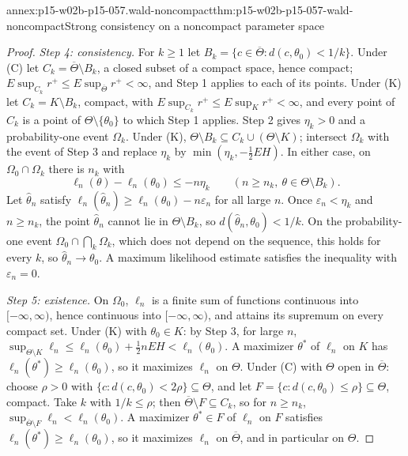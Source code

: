 \begin{annexitem}{annex:p15-w02b-p15-057.wald-noncompact}{thm:p15-w02b-p15-057-wald-noncompact}{Strong consistency on a noncompact parameter space}
\begin{proof}
\emph{Step 4: consistency.} For \(k\geq1\) let
\(B_k=\{c\in\overline\Theta:d(c,\theta_0)<1/k\}\). Under (C) let
\(C_k=\overline\Theta\setminus B_k\), a closed subset of a compact space,
hence compact; \(E\sup_{C_k}r^+\leq E\sup_{\overline\Theta}r^+<\infty\),
and Step 1 applies to each of its points. Under (K) let
\(C_k=K\setminus B_k\), compact, with
\(E\sup_{C_k}r^+\leq E\sup_Kr^+<\infty\), and every point of \(C_k\) is a
point of \(\Theta\setminus\{\theta_0\}\) to which Step 1 applies. Step 2
gives \(\eta_k>0\) and a probability-one event \(\Omega_k\). Under (K),
\(\Theta\setminus B_k\subseteq C_k\cup(\Theta\setminus K)\); intersect
\(\Omega_k\) with the event of Step 3 and replace \(\eta_k\) by
\(\min(\eta_k,-\tfrac12EH)\). In either case, on \(\Omega_0\cap\Omega_k\)
there is \(n_k\) with
\[
 \ell_n(\theta)-\ell_n(\theta_0)\leq-n\eta_k\qquad
 (n\geq n_k,\ \theta\in\Theta\setminus B_k).
\]
Let \(\widehat\theta_n\) satisfy
\(\ell_n(\widehat\theta_n)\geq\ell_n(\theta_0)-n\varepsilon_n\) for all
large \(n\). Once \(\varepsilon_n<\eta_k\) and \(n\geq n_k\), the point
\(\widehat\theta_n\) cannot lie in \(\Theta\setminus B_k\), so
\(d(\widehat\theta_n,\theta_0)<1/k\). On the probability-one event
\(\Omega_0\cap\bigcap_k\Omega_k\), which does not depend on the sequence,
this holds for every \(k\), so \(\widehat\theta_n\to\theta_0\). A maximum
likelihood estimate satisfies the inequality with \(\varepsilon_n=0\).

\emph{Step 5: existence.} On \(\Omega_0\), \(\ell_n\) is a finite sum of
functions continuous into \([-\infty,\infty)\), hence continuous into
\([-\infty,\infty)\), and attains its supremum on every compact set. Under
(K) with \(\theta_0\in K\): by Step 3, for large \(n\),
\(\sup_{\Theta\setminus K}\ell_n\leq\ell_n(\theta_0)+\tfrac12nEH
<\ell_n(\theta_0)\). A maximizer \(\theta^*\) of \(\ell_n\) on \(K\) has
\(\ell_n(\theta^*)\geq\ell_n(\theta_0)\), so it maximizes \(\ell_n\) on
\(\Theta\). Under (C) with \(\Theta\) open in \(\overline\Theta\): choose
\(\rho>0\) with \(\{c:d(c,\theta_0)<2\rho\}\subseteq\Theta\), and let
\(F=\{c:d(c,\theta_0)\leq\rho\}\subseteq\Theta\), compact. Take \(k\) with
\(1/k\leq\rho\); then \(\overline\Theta\setminus F\subseteq C_k\), so for
\(n\geq n_k\), \(\sup_{\overline\Theta\setminus F}\ell_n<\ell_n(\theta_0)\).
A maximizer \(\theta^*\in F\) of \(\ell_n\) on \(F\) satisfies
\(\ell_n(\theta^*)\geq\ell_n(\theta_0)\), so it maximizes \(\ell_n\) on
\(\overline\Theta\), and in particular on \(\Theta\).
\end{proof}
\end{annexitem}

